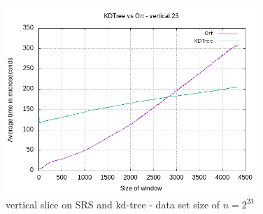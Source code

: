 \begin{figure}[h]
    \centering
    \includegraphics[width = 0.85\textwidth]{pictures/analysis/vert_23.png}
    \caption{vertical slice on SRS and kd-tree - data set size of $n=2^{23}$}\label{fig:vert_23}
\end{figure}

\clearpage

